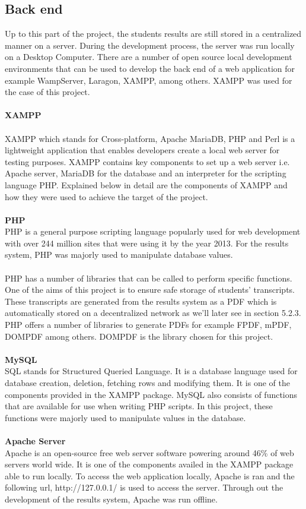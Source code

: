 \subsection{Back end}
Up to this part of the project, the students results are still stored in a centralized manner on a server. During the development process, the server was run locally on a Desktop Computer. There are a number of open source local development environments that can be used to develop the back end of a web application for example WampServer, Laragon, XAMPP, among others. XAMPP was used for the case of this project.\\~\\
\textbf{XAMPP}\\~\\
XAMPP which stands for Cross-platform, Apache MariaDB, PHP and Perl is a lightweight application that enables developers create a local web server for testing purposes. XAMPP contains key components to set up a web server i.e. Apache server, MariaDB for the database and an interpreter for the scripting language PHP. Explained below in detail are the components of XAMPP and how they were used to achieve the target of the project.\\~\\
\textbf{PHP}
\\PHP is a general purpose scripting language popularly used for web development with over 244 million sites that were using it by the year 2013. For the results system, PHP was majorly used to manipulate database values.\\~\\
PHP has a number of libraries that can be called to perform specific functions. One of the aims of this project is to ensure safe storage of students' transcripts. These transcripts are generated from the results system as a PDF which is automatically stored on a decentralized network as we'll later see in section 5.2.3. PHP offers a number of libraries to generate PDFs for example FPDF, mPDF, DOMPDF among others. DOMPDF is the library chosen for this project.\\~\\
\textbf{MySQL}\\
SQL stands for Structured Queried Language. It is a database language used for database creation, deletion, fetching rows and modifying them. It is one of the components provided in the XAMPP package. MySQL also consists of functions that are available for use when writing PHP scripts. In this project, these functions were majorly used to manipulate values in the database.\\~\\
\textbf{Apache Server}\\
Apache is an open-source free web server software powering around 46\% of web servers world wide. It is one of the components availed in the XAMPP package able to run locally. To access the web application locally, Apache is ran and the following url, http://127.0.0.1/ is used to access the server. Through out the development of the results system, Apache was run offline.
